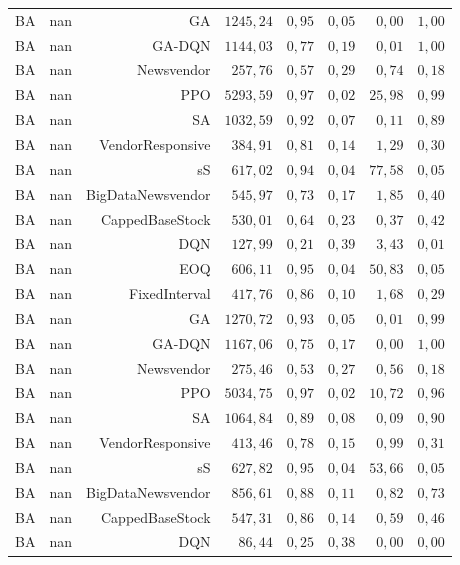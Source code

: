 \begin{table}[htb]
\begin{tabular}{llrrrrrr}
BA & nan & GA & $1245{,}24$ & $0{,}95$ & $0{,}05$ & $0{,}00$ & $1{,}00$ \\
BA & nan & GA-DQN & $1144{,}03$ & $0{,}77$ & $0{,}19$ & $0{,}01$ & $1{,}00$ \\
BA & nan & Newsvendor & $257{,}76$ & $0{,}57$ & $0{,}29$ & $0{,}74$ & $0{,}18$ \\
BA & nan & PPO & $5293{,}59$ & $0{,}97$ & $0{,}02$ & $25{,}98$ & $0{,}99$ \\
BA & nan & SA & $1032{,}59$ & $0{,}92$ & $0{,}07$ & $0{,}11$ & $0{,}89$ \\
BA & nan & VendorResponsive & $384{,}91$ & $0{,}81$ & $0{,}14$ & $1{,}29$ & $0{,}30$ \\
BA & nan & sS & $617{,}02$ & $0{,}94$ & $0{,}04$ & $77{,}58$ & $0{,}05$ \\
BA & nan & BigDataNewsvendor & $545{,}97$ & $0{,}73$ & $0{,}17$ & $1{,}85$ & $0{,}40$ \\
BA & nan & CappedBaseStock & $530{,}01$ & $0{,}64$ & $0{,}23$ & $0{,}37$ & $0{,}42$ \\
BA & nan & DQN & $127{,}99$ & $0{,}21$ & $0{,}39$ & $3{,}43$ & $0{,}01$ \\
BA & nan & EOQ & $606{,}11$ & $0{,}95$ & $0{,}04$ & $50{,}83$ & $0{,}05$ \\
BA & nan & FixedInterval & $417{,}76$ & $0{,}86$ & $0{,}10$ & $1{,}68$ & $0{,}29$ \\
BA & nan & GA & $1270{,}72$ & $0{,}93$ & $0{,}05$ & $0{,}01$ & $0{,}99$ \\
BA & nan & GA-DQN & $1167{,}06$ & $0{,}75$ & $0{,}17$ & $0{,}00$ & $1{,}00$ \\
BA & nan & Newsvendor & $275{,}46$ & $0{,}53$ & $0{,}27$ & $0{,}56$ & $0{,}18$ \\
BA & nan & PPO & $5034{,}75$ & $0{,}97$ & $0{,}02$ & $10{,}72$ & $0{,}96$ \\
BA & nan & SA & $1064{,}84$ & $0{,}89$ & $0{,}08$ & $0{,}09$ & $0{,}90$ \\
BA & nan & VendorResponsive & $413{,}46$ & $0{,}78$ & $0{,}15$ & $0{,}99$ & $0{,}31$ \\
BA & nan & sS & $627{,}82$ & $0{,}95$ & $0{,}04$ & $53{,}66$ & $0{,}05$ \\
BA & nan & BigDataNewsvendor & $856{,}61$ & $0{,}88$ & $0{,}11$ & $0{,}82$ & $0{,}73$ \\
BA & nan & CappedBaseStock & $547{,}31$ & $0{,}86$ & $0{,}14$ & $0{,}59$ & $0{,}46$ \\
BA & nan & DQN & $86{,}44$ & $0{,}25$ & $0{,}38$ & $0{,}00$ & $0{,}00$ \\

\end{tabular}
\end{table}
